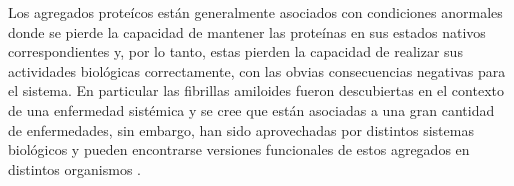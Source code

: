 % 
% 





Los agregados proteícos están generalmente asociados con condiciones anormales donde se pierde la capacidad de mantener las proteínas en sus estados nativos correspondientes 
y, por lo tanto, estas pierden la capacidad de realizar sus actividades biológicas correctamente, con las obvias consecuencias negativas para el sistema. 
En particular las fibrillas amiloides fueron descubiertas en el contexto de una enfermedad sistémica y se cree que están asociadas a una gran cantidad de enfermedades, sin embargo,
han sido aprovechadas por distintos sistemas biológicos y pueden encontrarse versiones funcionales de estos agregados en distintos organismos \cite{fowler2007functional}.











